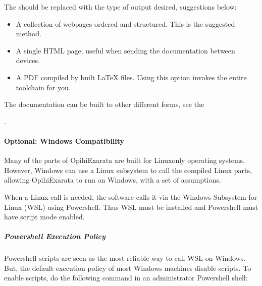 \documentclass[letterpaper,11pt,english]{sphinxmanual}
\begin{document}
\sphinxAtStartPar
The  should be replaced with the type of output desired, suggestions
below:
\begin{itemize}
\item {} 
\sphinxAtStartPar
{} A collection of webpages ordered and structured. This is the suggested method.

\item {} 
\sphinxAtStartPar
{} A single HTML page; useful when sending the documentation between devices.

\item {} 
\sphinxAtStartPar
{} A PDF compiled by built LaTeX files. Using this option invokes the entire toolchain for you.

\end{itemize}

\sphinxAtStartPar
The documentation can be built to other different forms, see the
%
\begin{footnote}[29]\sphinxAtStartFootnote
{}
%
\end{footnote}.

\sphinxstepscope


\paragraph{Optional: Windows Compatibility}
\label{\detokenize{technical/installation/windows:optional-windows-compatibility}}\label{\detokenize{technical/installation/windows:technical-installation-windows-compatibility}}\label{\detokenize{technical/installation/windows::doc}}
\sphinxAtStartPar
Many of the parts of OpihiExarata are built for Linux\sphinxhyphen{}only operating systems.
However, Windows can use a Linux subsystem to call the compiled Linux parts,
allowing OpihiExarata to run on Windows, with a set of assumptions.

\sphinxAtStartPar
When a Linux call is needed, the software calls it via the Windows Subsystem
for Linux (WSL) using Powershell. Thus WSL must be installed and Powershell
must have script mode enabled.


\subparagraph{Powershell Execution Policy}
\label{\detokenize{technical/installation/windows:powershell-execution-policy}}
\sphinxAtStartPar
Powershell scripts are seen as the most reliable way to call WSL on Windows.
But, the default execution policy of most Windows machines disable scripts. To
enable scripts, do the following command in an administrator Powershell shell:
\end{document}
